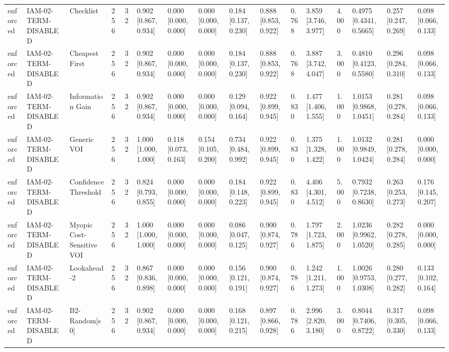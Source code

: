 \begin{table}[!ht]
{\begin{tabular}{llllllllllllllll}
enforced & IAM-02-TERM-DISABLED & Checklist & 256 & 32 & 0.902 [0.867, 0.934] & 0.000 [0.000, 0.000] & 0.000 [0.000, 0.000] & 0.184 [0.137, 0.230] & 0.888 [0.853, 0.922] & 0.768 & 3.859 [3.746, 3.977] & 4.000 & 0.4975 [0.4341, 0.5665] & 0.257 [0.247, 0.269] & 0.098 [0.066, 0.133] \\
enforced & IAM-02-TERM-DISABLED & Cheapest First & 256 & 32 & 0.902 [0.867, 0.934] & 0.000 [0.000, 0.000] & 0.000 [0.000, 0.000] & 0.184 [0.137, 0.230] & 0.888 [0.853, 0.922] & 0.768 & 3.887 [3.742, 4.047] & 3.000 & 0.4810 [0.4123, 0.5580] & 0.296 [0.284, 0.310] & 0.098 [0.066, 0.133] \\
enforced & IAM-02-TERM-DISABLED & Information Gain & 256 & 32 & 0.902 [0.867, 0.934] & 0.000 [0.000, 0.000] & 0.000 [0.000, 0.000] & 0.129 [0.094, 0.164] & 0.922 [0.899, 0.945] & 0.830 & 1.477 [1.406, 1.555] & 1.000 & 1.0153 [0.9868, 1.0451] & 0.281 [0.278, 0.284] & 0.098 [0.066, 0.133] \\
enforced & IAM-02-TERM-DISABLED & Generic VOI & 256 & 32 & 1.000 [1.000, 1.000] & 0.118 [0.073, 0.163] & 0.154 [0.105, 0.200] & 0.734 [0.484, 0.992] & 0.922 [0.899, 0.945] & 0.830 & 1.375 [1.328, 1.422] & 1.000 & 1.0132 [0.9849, 1.0424] & 0.281 [0.278, 0.284] & 0.000 [0.000, 0.000] \\
enforced & IAM-02-TERM-DISABLED & Confidence Threshold & 256 & 32 & 0.824 [0.793, 0.855] & 0.000 [0.000, 0.000] & 0.000 [0.000, 0.000] & 0.184 [0.148, 0.223] & 0.922 [0.899, 0.945] & 0.830 & 4.406 [4.301, 4.512] & 5.000 & 0.7932 [0.7238, 0.8630] & 0.263 [0.253, 0.273] & 0.176 [0.145, 0.207] \\
enforced & IAM-02-TERM-DISABLED & Myopic Cost-Sensitive VOI & 256 & 32 & 1.000 [1.000, 1.000] & 0.000 [0.000, 0.000] & 0.000 [0.000, 0.000] & 0.086 [0.047, 0.125] & 0.900 [0.874, 0.927] & 0.786 & 1.797 [1.723, 1.875] & 2.000 & 1.0236 [0.9962, 1.0520] & 0.282 [0.278, 0.285] & 0.000 [0.000, 0.000] \\
enforced & IAM-02-TERM-DISABLED & Lookahead-2 & 256 & 32 & 0.867 [0.836, 0.898] & 0.000 [0.000, 0.000] & 0.000 [0.000, 0.000] & 0.156 [0.121, 0.191] & 0.900 [0.874, 0.927] & 0.786 & 1.242 [1.211, 1.273] & 1.000 & 1.0026 [0.9753, 1.0308] & 0.280 [0.277, 0.282] & 0.133 [0.102, 0.164] \\
enforced & IAM-02-TERM-DISABLED & B2-Random[s0] & 256 & 32 & 0.902 [0.867, 0.934] & 0.000 [0.000, 0.000] & 0.000 [0.000, 0.000] & 0.168 [0.121, 0.215] & 0.897 [0.866, 0.928] & 0.786 & 2.996 [2.820, 3.180] & 3.000 & 0.8044 [0.7406, 0.8722] & 0.317 [0.305, 0.330] & 0.098 [0.066, 0.133] \\

\end{tabular}}
\end{table}
